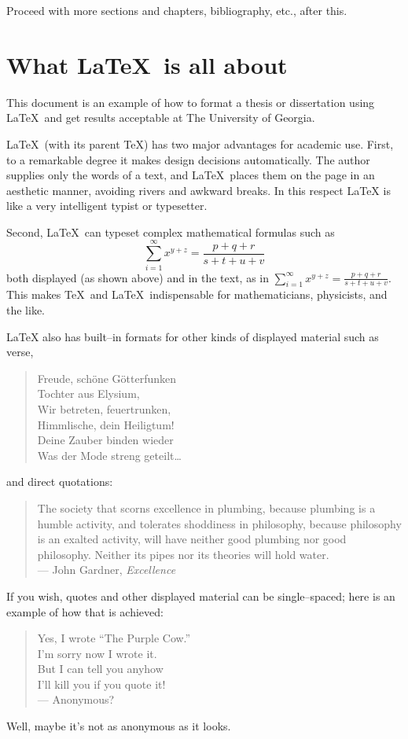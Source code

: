 \documentclass[12pt]{report}
\begin{document}
Proceed with more sections and chapters, bibliography, etc., after this.


\chapter{What \LaTeX\ is all about}

This document is an example of how to format a thesis or dissertation
using \LaTeX\  and get results acceptable at The University of Georgia.

\LaTeX\ (with its parent \TeX)
has two major advantages for academic use.  First, to a remarkable
degree it makes design decisions automatically.  The author supplies
only the words of a text, and \LaTeX\ places them on the page in an
aesthetic manner, avoiding rivers and awkward breaks.  In this respect
LaTeX is like a very intelligent typist or typesetter.

Second, \LaTeX\ can typeset complex mathematical formulas such as
\[
\sum_{i=1}^{\infty} x^{y+z} = \frac{p+q+r}{s+t+u+v}
\]
both displayed (as shown above) and in the text, as in
$\sum_{i=1}^{\infty} x^{y+z} = \frac{p+q+r}{s+t+u+v}$.
This makes \TeX\ and \LaTeX\ indispensable for mathematicians, physicists,
and the like.

LaTeX also has built--in formats for other kinds of displayed material
such as verse,
\begin{verse}
Freude, sch\"{o}ne G\"{o}tterfunken  \\
Tochter aus Elysium,                 \\
Wir betreten, feuertrunken,          \\
Himmlische, dein Heiligtum!          \\
Deine Zauber binden wieder            \\
Was der Mode streng geteilt\dots
\end{verse}
and direct quotations:
\begin{quote}
The society that scorns excellence in plumbing, because plumbing is a
humble activity, and tolerates shoddiness in philosophy, because
philosophy is an exalted activity, will have neither good plumbing nor
good philosophy.  Neither its pipes nor its theories will hold water.\\
\hspace*{\fill} --- John Gardner, {\em Excellence}
\end{quote}
If you wish, quotes and other displayed material can be single--spaced;
here is an example of how that is achieved:
\begin{verse}
\begin{singlespace}
Yes, I wrote ``The Purple Cow.'' \\
I'm sorry now I wrote it. \\
But I can tell you anyhow \\
I'll kill you if you quote it! \\
\hfill --- Anonymous?
\end{singlespace}
\end{verse}
Well, maybe it's not as anonymous as it looks.
\end{document}
